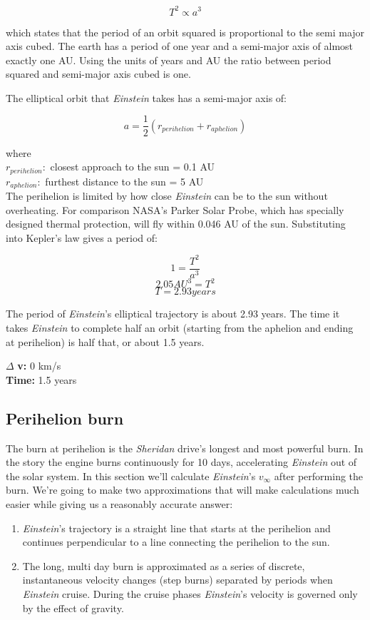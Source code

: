 \documentclass[12pt]{article} %
\begin{document}
$$T^2 \propto a^3$$

which states that the period of an orbit squared is proportional to the semi major axis cubed. The earth has a period of one year and a semi-major axis of almost exactly one AU. Using the units of years and AU the ratio between period squared and semi-major axis cubed is one.

The elliptical orbit that \textit{Einstein} takes has a semi-major axis of:

$$a = \frac{1}{2}(r_{perihelion} + r_{aphelion})$$

where\\
$r_{perihelion}:$ closest approach to the sun = 0.1 AU\\
$r_{aphelion}:$ furthest distance to the sun = 5 AU\\

The perihelion is limited by how close \textit{Einstein} can be to the sun without overheating. For comparison NASA's Parker Solar Probe, which has specially designed thermal protection, will fly within 0.046 AU of the sun. Substituting into Kepler's law gives a period of:

$$1 = \frac{T^2}{a^3}$$
$$2.05AU^{3} = T^2$$
$$T = 2.93 years$$

The period of \textit{Einstein}'s elliptical trajectory is about 2.93 years. The time it takes \textit{Einstein} to complete half an orbit (starting from the aphelion and ending at perihelion) is half that, or about 1.5 years.

$\Delta$ \textbf{v:} 0 km/s\\
\textbf{Time:} 1.5 years

\subsection{Perihelion burn}
The burn at perihelion is the \textit{Sheridan} drive's longest and most powerful burn. In the story the engine burns continuously for 10 days, accelerating \textit{Einstein} out of the solar system. In this section we'll calculate \textit{Einstein}'s $v_{\infty}$ after performing the burn. We're going to make two approximations that will make calculations much easier while giving us a reasonably accurate answer:

\begin{enumerate}
\item \textit{Einstein}'s trajectory is a straight line that starts at the perihelion and continues perpendicular to a line connecting the perihelion to the sun.
\item The long, multi day burn is approximated as a series of discrete, instantaneous velocity changes (step burns) separated by periods when \textit{Einstein} cruise. During the cruise phases \textit{Einstein}'s velocity is governed only by the effect of gravity.
\end{enumerate}
\end{document}
